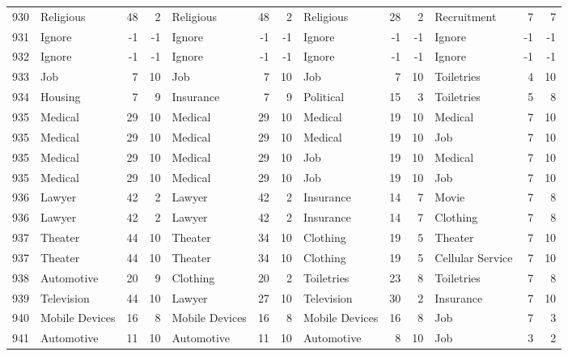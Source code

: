 \begin{figure}[htbp]
\begin{tabular}{rlrrlrrlrrlrr}
    930   & Religious & 48    & 2     & Religious & 48    & 2     & Religious & 28    & 2     & Recruitment & 7     & 7 \\
    931   & Ignore & -1    & -1    & Ignore & -1    & -1    & Ignore & -1    & -1    & Ignore & -1    & -1 \\
    932   & Ignore & -1    & -1    & Ignore & -1    & -1    & Ignore & -1    & -1    & Ignore & -1    & -1 \\
    933   & Job   & 7     & 10    & Job   & 7     & 10    & Job   & 7     & 10    & Toiletries & 4     & 10 \\
    934   & Housing & 7     & 9     & Insurance & 7     & 9     & Political & 15    & 3     & Toiletries & 5     & 8 \\
    935   & Medical & 29    & 10    & Medical & 29    & 10    & Medical & 19    & 10    & Medical & 7     & 10 \\
    935   & Medical & 29    & 10    & Medical & 29    & 10    & Medical & 19    & 10    & Job   & 7     & 10 \\
    935   & Medical & 29    & 10    & Medical & 29    & 10    & Job   & 19    & 10    & Medical & 7     & 10 \\
    935   & Medical & 29    & 10    & Medical & 29    & 10    & Job   & 19    & 10    & Job   & 7     & 10 \\
    936   & Lawyer & 42    & 2     & Lawyer & 42    & 2     & Insurance & 14    & 7     & Movie & 7     & 8 \\
    936   & Lawyer & 42    & 2     & Lawyer & 42    & 2     & Insurance & 14    & 7     & Clothing & 7     & 8 \\
    937   & Theater & 44    & 10    & Theater & 34    & 10    & Clothing & 19    & 5     & Theater & 7     & 10 \\
    937   & Theater & 44    & 10    & Theater & 34    & 10    & Clothing & 19    & 5     & Cellular Service & 7     & 10 \\
    938   & Automotive & 20    & 9     & Clothing & 20    & 2     & Toiletries & 23    & 8     & Toiletries & 7     & 8 \\
    939   & Television & 44    & 10    & Lawyer & 27    & 10    & Television & 30    & 2     & Insurance & 7     & 10 \\
    940   & Mobile Devices & 16    & 8     & Mobile Devices & 16    & 8     & Mobile Devices & 16    & 8     & Job   & 7     & 3 \\
    941   & Automotive & 11    & 10    & Automotive & 11    & 10    & Automotive & 8     & 10    & Job   & 3     & 2 \\

\end{tabular}
\end{figure}
